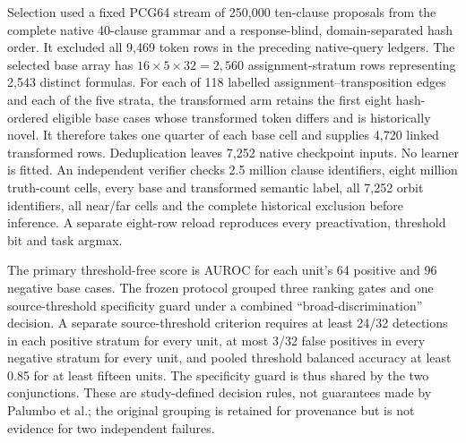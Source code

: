 \documentclass[
  british,
  11pt,
  a4paper,
]{article}
\begin{document}
Selection used a fixed PCG64 stream of 250,000 ten-clause proposals from
the complete native 40-clause grammar and a response-blind,
domain-separated hash order. It excluded all 9,469 token rows in the
preceding native-query ledgers. The selected base array has
\(16\times5\times32=2,560\) assignment-stratum rows representing 2,543
distinct formulas. For each of 118 labelled assignment--transposition
edges and each of the five strata, the transformed arm retains the first
eight hash-ordered eligible base cases whose transformed token differs
and is historically novel. It therefore takes one quarter of each base
cell and supplies 4,720 linked transformed rows. Deduplication leaves
7,252 native checkpoint inputs. No learner is fitted. An independent
verifier checks 2.5 million clause identifiers, eight million
truth-count cells, every base and transformed semantic label, all 7,252
orbit identifiers, all near/far cells and the complete historical
exclusion before inference. A separate eight-row reload reproduces every
preactivation, threshold bit and task argmax.

The primary threshold-free score is AUROC for each unit's 64 positive
and 96 negative base cases. The frozen protocol grouped three ranking
gates and one source-threshold specificity guard under a combined
``broad-discrimination'' decision. A separate source-threshold criterion
requires at least 24/32 detections in each positive stratum for every
unit, at most 3/32 false positives in every negative stratum for every
unit, and pooled threshold balanced accuracy at least 0.85 for at least
fifteen units. The specificity guard is thus shared by the two
conjunctions. These are study-defined decision rules, not guarantees
made by Palumbo et al.; the original grouping is retained for provenance
but is not evidence for two independent failures.
\end{document}
